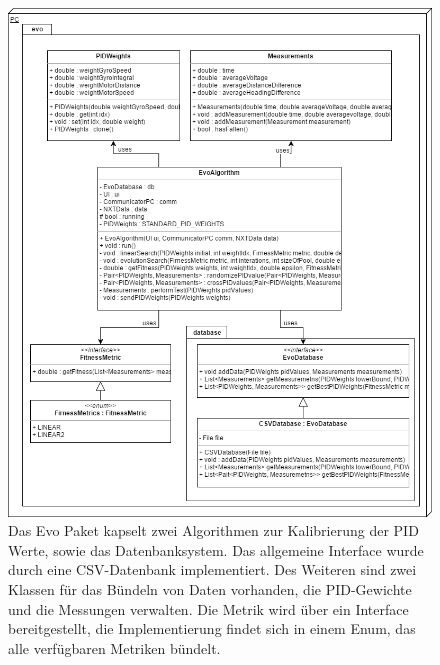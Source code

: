 \documentclass[oneside,abstractoff,a4paper]{scrartcl}
\begin{document}
\begin{figure}
	\includegraphics[width=\textwidth,height=\textheight,keepaspectratio]{evo.png}
    \caption{Das Evo Paket kapselt zwei Algorithmen zur Kalibrierung der PID Werte, sowie das Datenbanksystem. Das allgemeine Interface wurde durch eine CSV-Datenbank implementiert. Des Weiteren sind zwei Klassen für das Bündeln von Daten vorhanden, die PID-Gewichte und die Messungen verwalten. Die Metrik wird über ein Interface bereitgestellt, die Implementierung findet sich in einem Enum, das alle verfügbaren Metriken bündelt.}
    \label{fig:evo}
\end{figure}
\end{document}
